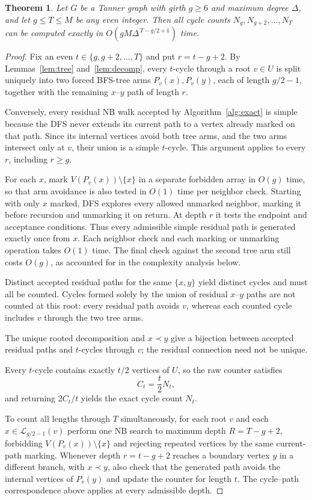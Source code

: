 \documentclass[conference]{IEEEtran}
\newtheorem{theorem}{Theorem}
\newcommand{\cL}{\mathcal{L}}
\begin{document}
\begin{theorem}\label{thm:exact}
Let $G$ be a Tanner graph with girth $g\ge6$ and maximum degree $\Delta$, and let
$g\le T\le M$ be any even integer. Then all cycle counts $N_g,N_{g+2},\ldots,N_T$
can be computed exactly in $O\!\left(gM\Delta^{\,T-g/2+1}\right)$
time. 
\end{theorem}
\begin{proof}
Fix an even $t\in\{g,g+2,\ldots,T\}$ and put $r=t-g+2$. By
Lemmas~\ref{lem:tree} and~\ref{lem:decomp}, every $t$-cycle through a root
$v\in U$ is split uniquely into two forced BFS-tree arms
$P_v(x),P_v(y)$, each of length $g/2-1$, together with the remaining
$x$--$y$ path of length $r$.

Conversely, every residual NB walk accepted by Algorithm~\ref{alg:exact}
is simple because the DFS never extends its current path to a vertex
already marked on that path. Since its internal vertices avoid both tree
arms, and the two arms intersect only at $v$, their union is a simple
$t$-cycle. This argument applies to every $r$, including $r\ge g$.

For each $x$, mark $V(P_v(x))\setminus\{x\}$ in a separate forbidden
array in $O(g)$ time, so that arm avoidance is also tested in $O(1)$
time per neighbor check. Starting with only $x$ marked, DFS explores every allowed unmarked
neighbor, marking it before recursion and unmarking it on return.
At depth $r$ it tests the endpoint and acceptance conditions. Thus every
admissible simple residual path is generated exactly once from $x$. Each neighbor check and each marking or unmarking operation takes
$O(1)$ time. The final check against the second tree arm still costs
$O(g)$, as accounted for in the complexity analysis below.

Distinct accepted residual paths for the same $\{x,y\}$ yield distinct
cycles and must all be counted. 
Cycles formed solely by the union of residual $x$--$y$ paths are not
counted at this root: every residual path avoids $v$, whereas each
counted cycle includes $v$ through the two tree arms.

The unique rooted decomposition and $x\prec y$ give a bijection between
accepted residual paths and $t$-cycles through $v$; the residual connection
need not be unique.

Every $t$-cycle contains exactly $t/2$ vertices of $U$, so the raw counter satisfies
\[
C_t=\frac{t}{2}N_t,
\]
and returning $2C_t/t$ yields the exact cycle count $N_t$.

To count all lengths through $T$ simultaneously, for each root $v$ and each
$x\in\cL_{g/2-1}(v)$ perform one NB search to maximum depth
$R=T-g+2$, forbidding $V(P_v(x))\setminus\{x\}$ and rejecting repeated
vertices by the same current-path marking. Whenever depth
$r=t-g+2$ reaches a boundary vertex $y$ in a different branch, with
$x\prec y$, also check that the generated path avoids the internal vertices
of $P_v(y)$ and update the counter for length $t$. The cycle--path
correspondence above applies at every admissible depth.


\end{proof}
\end{document}
